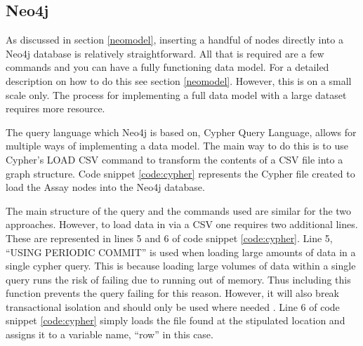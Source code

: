 \subsection{Neo4j}\label{neoload}
As discussed in section \ref{neomodel}, inserting a handful of nodes directly into a Neo4j database is relatively straightforward. All that is required are a few commands and you can have a fully functioning data model. For a detailed description on how to do this see section \ref{neomodel}. However, this is on a small scale only. The process for implementing a full data model with a large dataset requires more resource.

The query language which Neo4j is based on, Cypher Query Language, allows for multiple ways of implementing a data model. The main way to do this is to use Cypher's LOAD CSV command to transform the contents of a CSV file into a graph structure. Code snippet \ref{code:cypher} represents the Cypher file created to load the Assay nodes into the Neo4j database.

The main structure of the query and the commands used are similar for the two approaches. However, to load data in via a CSV one requires two additional lines. These are represented in lines 5 and 6 of code snippet \ref{code:cypher}. Line 5, ``USING PERIODIC COMMIT'' is used when loading large amounts of data in a single cypher query. This is because loading large volumes of data within a single query runs the risk of failing due to running out of memory. Thus including this function prevents the query failing for this reason. However, it will also break transactional isolation and should only be used where needed \cite{neo}. Line 6 of code snippet \ref{code:cypher} simply loads the file found at the stipulated location and assigns it to a variable name, ``row'' in this case.

